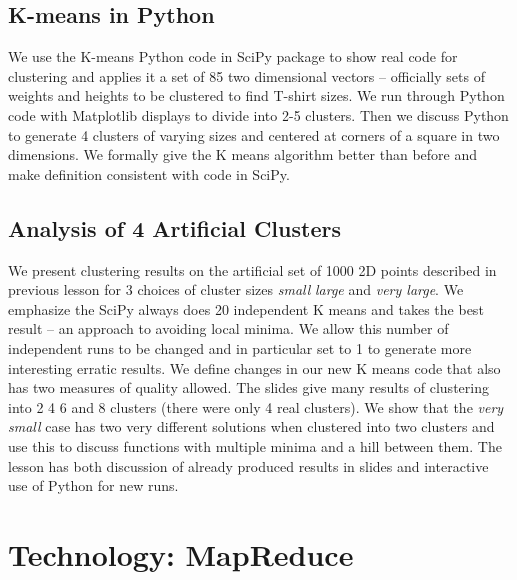 



\subsection{K-means in Python}\label{k-means-in-python}

We use the K-means Python code in SciPy package to show real code for
clustering and applies it a set of 85 two dimensional vectors --
officially sets of weights and heights to be clustered to find T-shirt
sizes. We run through Python code with Matplotlib displays to divide
into 2-5 clusters. Then we discuss Python to generate 4 clusters of
varying sizes and centered at corners of a square in two dimensions. We
formally give the K means algorithm better than before and make
definition consistent with code in SciPy.

\subsection{Analysis of 4 Artificial
Clusters}\label{analysis-of-4-artificial-clusters}

We present clustering results on the artificial set of 1000 2D points
described in previous lesson for 3 choices of cluster sizes \emph{small}
\emph{large} and \emph{very large}. We emphasize the SciPy always does
20 independent K means and takes the best result -- an approach to
avoiding local minima. We allow this number of independent runs to be
changed and in particular set to 1 to generate more interesting erratic
results. We define changes in our new K means code that also has two
measures of quality allowed. The slides give many results of clustering
into 2 4 6 and 8 clusters (there were only 4 real clusters). We show
that the \emph{very small} case has two very different solutions when
clustered into two clusters and use this to discuss functions with
multiple minima and a hill between them. The lesson has both discussion
of already produced results in slides and interactive use of Python for
new runs.

\section{Technology: MapReduce}\label{technology-mapreduce}

